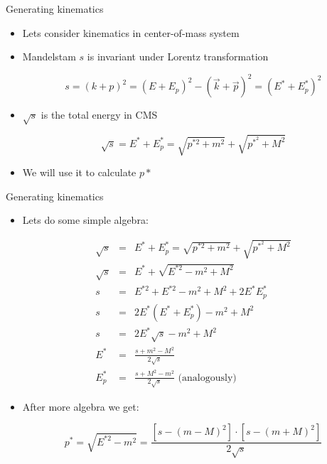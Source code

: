 \begin{slide}{Generating kinematics}
\null\vfill

  

  \begin{itemize}
    \item Lets consider kinematics in center-of-mass system
    \item Mandelstam $s$ is invariant under Lorentz transformation
   
    $$s = (k + p)^2 = (E + E_p)^2 - (\vec k + \vec p)^2 = (E^* + E_p^*)^2$$
   
    \item $\sqrt{s}$ is the total energy in CMS

    $$\sqrt{s} = E^* + E_p^* = \sqrt{p^{*2} + m^2} + \sqrt{p^{*^2} + M^2}$$
    
    \item We will use it to calculate $p*$
   
  \end{itemize}

\vfill\null
\end{slide}

\begin{slide}[toc=]{Generating kinematics}
\null\vfill
  
  \begin{itemize}
   \item Lets do some simple algebra:

  \vspace{-10pt}
  \begin{eqnarray*}
    \sqrt{s} & = & E^* + E_p^* = \sqrt{p^{*2} + m^2} + \sqrt{p^{*^2} + M^2} \\
    \sqrt{s} & = & E^* + \sqrt{E^{*2} - m^2 + M^2} \\
    s & = & E^{*2} + E^{*2} - m^2 + M^2 + 2E^*E_p^* \\
    s & = & 2E^*(E^* + E_p^*) - m^2 + M^2 \\
    s & = & 2E^*\sqrt{s} - m^2 + M^2 \\
    E^* & = & \frac{s + m^2 - M^2}{2\sqrt{s}} \\
    E_p^* & =&  \frac{s + M^2 - m^2}{2\sqrt{s}} \mbox{ (analogously)}
  \end{eqnarray*}
  
  \item After more algebra we get:
  
  \vspace{-10pt}
  $$p^* = \sqrt{E^{*2} - m^2} = \frac{[s - (m - M)^2]\cdot[s - (m + M)^2]}{2\sqrt{s}}$$

  \end{itemize}

\vfill\null
\end{slide}

